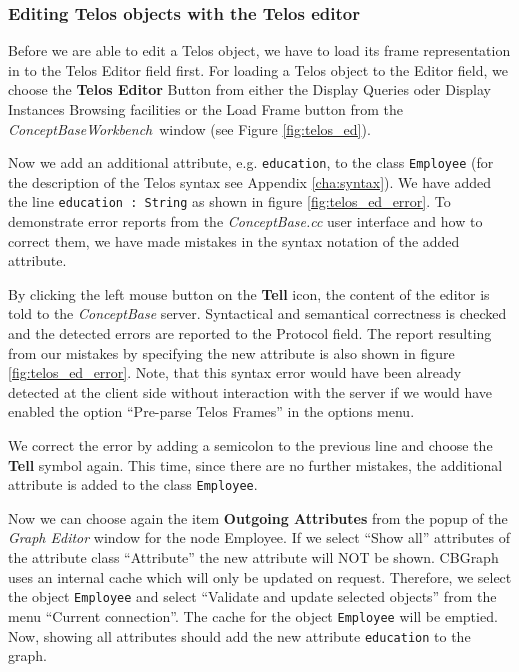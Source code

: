 \subsubsection{Editing Telos objects with the Telos editor}

Before we are able to edit a Telos object, we have to load its frame
representation in to the Telos Editor field first. For loading a Telos
object to the Editor field, we choose the {\bf Telos Editor} Button from
either the Display Queries oder Display Instances Browsing facilities or the
{Load Frame} button from the {\em ConceptBase\/Workbench}\ window (see
Figure \ref{fig:telos_ed}).



Now we add an additional attribute, e.g. {\tt education}, to the class {\tt Employee}
(for the description of the Telos syntax see Appendix \ref{cha:syntax}). We have added
the line {\tt education : String} as shown in figure \ref{fig:telos_ed_error}.
To demonstrate error reports
from the {\em ConceptBase.cc\/} user interface and how to correct them, we have made mistakes in the syntax
notation of the added attribute.


By clicking the left mouse button on the {\bf Tell} icon, the content of the
editor is told to the {\em ConceptBase}  server. Syntactical and semantical
correctness is checked and the detected errors are reported to the Protocol field.
The report resulting from our mistakes by specifying
the new attribute is also shown in figure \ref{fig:telos_ed_error}.
Note, that this syntax error would have been already detected at the client side
without interaction with the server if we would have enabled the option
``Pre-parse Telos Frames'' in the options menu.

We correct the error by adding a semicolon to the previous line
and choose the {\bf Tell} symbol again. This time,
since there are no further mistakes, the additional attribute is added to
the class {\tt Employee}.

Now we can choose again the item {\bf Outgoing Attributes} from the popup of the
{\em Graph Editor} window for the node Employee. If we select ``Show all'' attributes
of the attribute class ``Attribute'' the new attribute will NOT be shown.
CBGraph uses an internal cache which will only be updated on request.
Therefore, we select the object {\tt Employee} and select ``Validate and
update selected objects'' from the menu ``Current connection''. The cache
for the object {\tt Employee} will be emptied. Now, showing all attributes
should add the new attribute {\tt education} to the graph.


